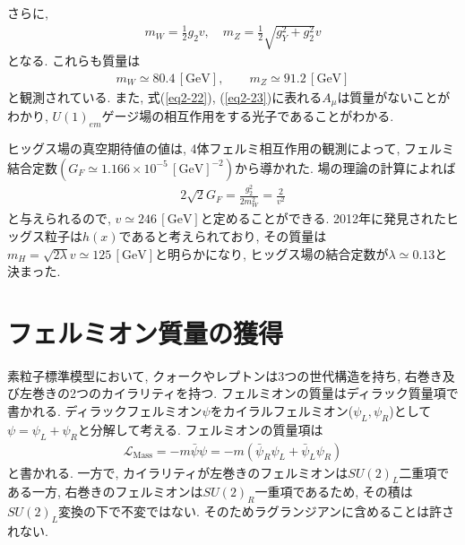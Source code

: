 さらに,
\begin{align}
  m_W = \frac{1}{2}g_2v,\quad m_Z = \frac{1}{2}\sqrt{g_Y^2+g_2^2}v\nonumber
\end{align}
となる.
これらも質量は
\begin{align}
  m_W \simeq 80.4\,\mathrm{[GeV]},\qquad m_Z \simeq 91.2\,\mathrm{[GeV]} \nonumber
\end{align}
と観測されている.
また, 式(\ref{eq2-22}), (\ref{eq2-23})に表れる$A_\mu$は質量がないことがわかり, $U(1)_{em}$ゲージ場の相互作用をする光子であることがわかる.

ヒッグス場の真空期待値の値は, 4体フェルミ相互作用の観測によって, フェルミ結合定数$(G_F\simeq 1.166\times 10^{-5}\,\mathrm{[GeV]}^{-2})$から導かれた.
場の理論の計算によれば
\begin{align}
  2\sqrt{2}G_F = \frac{g_2^2}{2m_W^2} = \frac{2}{v^2}\nonumber
\end{align}
と与えられるので, $v \simeq 246\,\mathrm{[GeV]}$と定めることができる.
2012年に発見されたヒッグス粒子は$h(x)$であると考えられており, その質量は$m_H = \sqrt{2\lambda}v \simeq 125\,\mathrm{[GeV]}$と明らかになり, ヒッグス場の結合定数が$\lambda \simeq 0.13$と決まった.
\section{フェルミオン質量の獲得}
素粒子標準模型において, クォークやレプトンは3つの世代構造を持ち, 右巻き及び左巻きの2つのカイラリティを持つ.
フェルミオンの質量はディラック質量項で書かれる.
ディラックフェルミオン$\psi$をカイラルフェルミオン($\psi_L, \psi_R$)として$\psi=\psi_L + \psi_R$と分解して考える.
フェルミオンの質量項は
\begin{align}
  \mathcal{L}_{\mathrm{Mass}} = -m\bar{\psi}\psi = -m(\bar{\psi}_R\psi_L + \bar{\psi}_L\psi_R)\nonumber
\end{align}
と書かれる.
一方で, カイラリティが左巻きのフェルミオンは$SU(2)_L$二重項である一方, 右巻きのフェルミオンは$SU(2)_R$一重項であるため, その積は$SU(2)_L$変換の下で不変ではない.
そのためラグランジアンに含めることは許されない.

